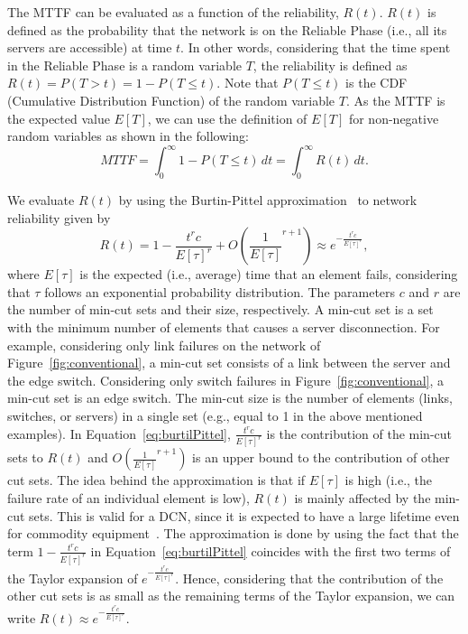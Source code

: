 The MTTF can be evaluated as a function of the reliability, $R(t)$. $R(t)$ is defined as the probability that the network is on the Reliable Phase (i.e., all its servers are accessible) at time $t$. In other words, considering that the time spent in the Reliable Phase is a random variable $T$, the reliability is defined as $R(t) = P(T > t) = 1 - P(T \leq t)$. Note that $P(T \leq t)$ is the CDF (Cumulative Distribution Function) of the random variable $T$. As the MTTF is the expected value $E[T]$, we can use the definition of $E[T]$ for non-negative random variables as shown in the following:
\begin{equation}
MTTF = \int_{0}^{\infty} 1 - P(T \leq t) \, dt = \int_{0}^{\infty} R(t) \, dt.
\label{eq:mttfReliability}
\end{equation}

We evaluate $R(t)$ by using the Burtin-Pittel approximation~\cite{gertzbakh2009models} to network reliability given by
\begin{equation}
R(t) = 1 - \frac{t^rc}{{E[\tau]}^r} + O \left ({\frac{1}{E[\tau]}}^{r+1} \right) \approx e^{-\frac{t^rc}{{E[\tau]}^r}},
\label{eq:burtilPittel}
\end{equation}
where ${E[\tau]}$ is the expected (i.e., average) time that an element fails, considering that $\tau$ follows an exponential probability distribution. The parameters $c$ and $r$ are the number of min-cut sets and their size, respectively. A min-cut set is a set with the minimum number of elements that causes a server disconnection. For example, considering only link failures on the network of Figure~\ref{fig:conventional}, a min-cut set consists of a link between the server and the edge switch. Considering only switch failures in Figure~\ref{fig:conventional}, a min-cut set is an edge switch. 
The min-cut size is the number of elements (links, switches, or servers) in a single set (e.g., equal to 1 in the above mentioned examples). In Equation~\ref{eq:burtilPittel}, $\frac{t^rc}{{E[\tau]}^r}$ is the contribution of the min-cut sets to $R(t)$ and $O \left ({\frac{1}{E[\tau]}}^{r+1} \right)$ is an upper bound to the contribution of other cut sets. The idea behind the approximation is that if ${E[\tau]}$ is high (i.e., the failure rate of an individual element is low), $R(t)$ is mainly affected by the min-cut sets. This is valid for a DCN, since it is expected to have a large lifetime even for commodity equipment~\cite{gill2011understanding}.
The approximation is done by using the fact that the term $1 - \frac{t^rc}{{E[\tau]}^r}$ in Equation~\ref{eq:burtilPittel} coincides with the first two terms of the Taylor expansion of $e^{-\frac{t^rc}{{E[\tau]}^r}}$. Hence, considering that the contribution of the other cut sets is as small as the remaining terms of the Taylor expansion, we can write $R(t) \approx e^{-\frac{t^rc}{{E[\tau]}^r}}$. 

